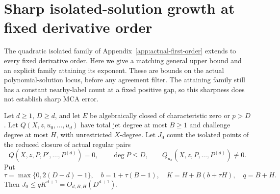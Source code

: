 \section{Sharp isolated-solution growth at fixed derivative order}
\label{app:isolated-sharpness}

The quadratic isolated family of Appendix~\ref{app:actual-first-order}
extends to every fixed derivative order. Here we give a matching general
upper bound and an explicit family attaining its exponent. These are
bounds on the actual polynomial-solution locus, before any agreement
filter. The attaining family still has a constant nearby-label count at
a fixed positive gap, so this sharpness does not establish sharp MCA error.

\begin{theorem}
\label{thm:isolated-upper}
Let $d\ge1$, $D\ge d$, and let $E$ be algebraically closed of
characteristic zero or $p>D$. Let $Q(X,z,u_0,\ldots,u_d)$ have total
jet degree at most $B\ge1$ and challenge degree at most $H$, with
unrestricted $X$-degree. Let $J_0$ count the isolated points of the
reduced closure of actual regular pairs
\[
 Q(X,z,P,P',\ldots,P^{(d)})=0,\qquad \deg P\le D,\qquad
 Q_{u_d}(X,z,P,\ldots,P^{(d)})\not\equiv0.
\]
Put
\[
 \tau=\max\{0,2(D-d)-1\},\quad b=1+\tau(B-1),\quad
 K=H+B(b+\tau H),\quad q=B+H.
\]
Then $J_0\le qK^{d+1}=O_{d,B,H}(D^{d+1})$.
\end{theorem}
